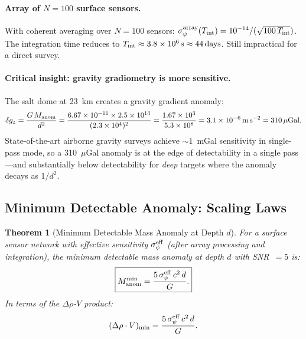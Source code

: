 \documentclass[aps,prd,twocolumn,superscriptaddress,nofootinbib]{revtex4-2}
\newcommand{\drho}{\Delta\rho}
\newtheorem{theorem}{Theorem}
\begin{document}
\paragraph{Array of $N = 100$ surface sensors.}
With coherent averaging over $N = 100$ sensors:
$\sigma_\psi^{\rm array}(T_{\rm int}) = 10^{-14}/({\sqrt{100\,T_{\rm int}}})$.
The integration time reduces to $T_{\rm int} \approx 3.8\times10^6\,\mathrm{s}
\approx 44\,\mathrm{days}$.  Still impractical for a direct survey.

\paragraph{Critical insight: gravity gradiometry is more sensitive.}
The salt dome at 23~km creates a gravity gradient anomaly:
\begin{equation}
  \delta g_z = \frac{G\,M_{\rm anom}}{d^2}
  = \frac{6.67\times10^{-11}\times2.5\times10^{13}}
  {(2.3\times10^4)^2}
  = \frac{1.67\times10^3}{5.3\times10^8}
  = 3.1\times10^{-6}\,\mathrm{m\,s}^{-2}
  = 310\,\mu\mathrm{Gal}.
  \label{eq:gravity-anom}
\end{equation}
State-of-the-art airborne gravity surveys achieve $\sim 1$~mGal
sensitivity in single-pass mode, so a 310~$\mu$Gal anomaly is
at the edge of detectability in a single pass---and substantially
below detectability for \emph{deep} targets where the anomaly
decays as $1/d^2$.

\subsection{Minimum Detectable Anomaly: Scaling Laws}

\begin{theorem}[Minimum Detectable Mass Anomaly at Depth $d$]
\label{thm:min-mass}
For a surface sensor network with effective sensitivity
$\sigma_\psi^{\rm eff}$ (after array processing and integration),
the minimum detectable mass anomaly at depth $d$ with SNR~$= 5$ is:
\begin{equation}
  \boxed{
  M_{\rm anom}^{\min} = \frac{5\,\sigma_\psi^{\rm eff}\,c^2\,d}{G}.
  }
  \label{eq:min-mass}
\end{equation}
In terms of the $\drho$-$V$ product:
\begin{equation}
  (\drho \cdot V)_{\min} = \frac{5\,\sigma_\psi^{\rm eff}\,c^2\,d}{G}.
  \label{eq:min-drhoV}
\end{equation}
\end{theorem}
\end{document}
